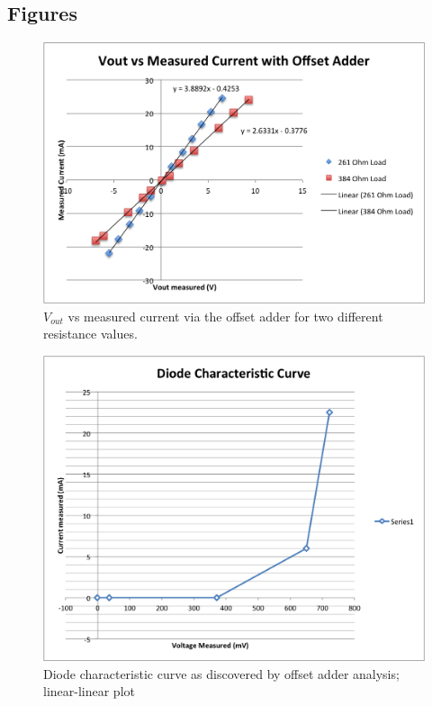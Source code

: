 \documentclass{article}
\begin{document}
\subsection{Figures}
    \begin{figure}[H]
        \centering
        \includegraphics[scale = 0.6]{3_3.png}
        \caption{$V_{out}$ vs measured current via the offset adder for two different resistance values.}
        \label{fig:my_label}
    \end{figure}
    \begin{figure}[H]
        \centering
        \includegraphics[scale = 0.6]{3_4a.png}
        \caption{Diode characteristic curve as discovered by offset adder analysis; linear-linear plot}
        \label{fig:my_label}
    \end{figure}
\end{document}
